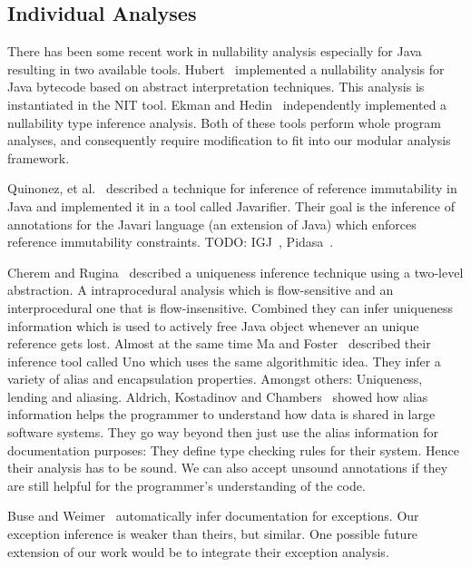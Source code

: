 \subsection{Individual Analyses}

There has been some recent work in nullability analysis especially for Java resulting in two available tools.  Hubert~\cite{NIT} implemented a nullability analysis for Java bytecode based on abstract interpretation techniques.  This analysis is instantiated in the {\sc NIT} tool.  Ekman and Hedin~\cite{NonNullTypeInference} independently implemented a nullability type inference analysis.  Both of these tools perform whole program analyses, and consequently require modification to fit into our modular analysis framework.

Quinonez, et al.~\cite{Javarifier} described a technique for inference of
reference immutability in Java and implemented it in a tool called {\sc
  Javarifier}. Their goal is the inference of annotations for the {\sc Javari}
language (an extension of Java) which enforces reference immutability
constraints. TODO: IGJ~\cite{IGJ}, Pidasa~\cite{Pidasa}.

Cherem and Rugina~\cite{UniquenessInference} described a uniqueness inference technique using a two-level
abstraction. A intraprocedural analysis which is flow-sensitive and an interprocedural
one that is flow-insensitive. Combined they can infer uniqueness information
which is used to actively free Java object whenever an unique reference gets lost.
Almost at the same time Ma and Foster~\cite{Uno} described their inference tool called
Uno which uses the same algorithmitic idea. They infer a variety of alias and encapsulation
properties. Amongst others: Uniqueness, lending and aliasing.
Aldrich, Kostadinov and Chambers~\cite{AliasJava} showed how alias information 
helps the programmer to understand how data is shared in large software systems.
They go way beyond then just use the alias information for documentation purposes:
They define type checking rules for their system. Hence their analysis has to be
sound. We can also accept unsound annotations if they are still helpful for the programmer's
understanding of the code.

Buse and Weimer~\cite{autodoc} automatically infer documentation for
exceptions.  Our exception inference is weaker than theirs, but similar.  One
possible future extension of our work would be to integrate their exception
analysis.
